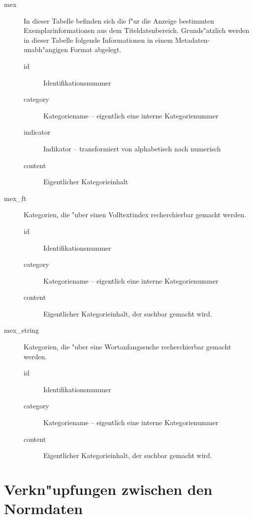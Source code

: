 \documentclass[11pt, twoside, a4paper, BCOR8mm, DIV12, bibtotoc,idxtotoc]{scrbook}
\begin{document}
\begin{itemize}
\begin{description}
\item[mex] In dieser Tabelle befinden sich die f"ur die Anzeige
  bestimmten Exemplarinformationen aus dem Titeldatenbereich.
  Grunds"atzlich werden in dieser Tabelle folgende Informationen in
  einem Metadaten-unabh"angigen Format abgelegt.
  \begin{description}
  \item[id] Identifikationsnummer
  \item[category] Kategoriename -- eigentlich eine interne Kategorienummer
  \item[indicator] Indikator -- transformiert von alphabetisch nach numerisch
  \item[content] Eigentlicher Kategorieinhalt
  \end{description}
\item[mex\_ft] Kategorien, die "uber einen Volltextindex recherchierbar
  gemacht werden.
  \begin{description}
  \item[id] Identifikationsnummer
  \item[category] Kategoriename -- eigentlich eine interne Kategorienummer
  \item[content] Eigentlicher Kategorieinhalt, der suchbar gemacht wird.
  \end{description}
\item[mex\_string] Kategorien, die "uber eine Wortanfangssuche
  recherchierbar gemacht werden.
  \begin{description}
  \item[id] Identifikationsnummer
  \item[category] Kategoriename -- eigentlich eine interne Kategorienummer
  \item[content] Eigentlicher Kategorieinhalt, der suchbar gemacht wird.
  \end{description}
\end{description}

\section{Verkn"upfungen zwischen den Normdaten}


\end{itemize}
\end{document}
